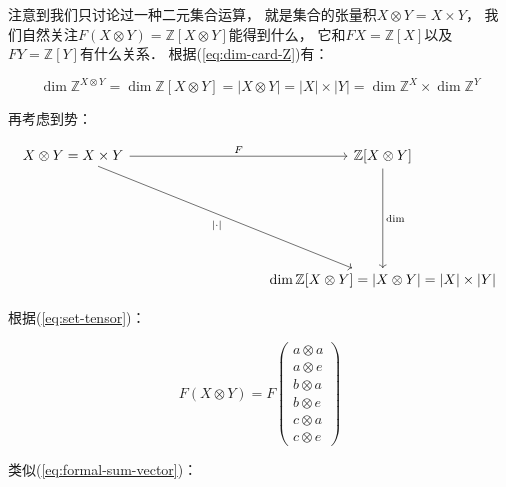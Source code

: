 \documentclass[10pt, openany]{book}
\begin{document}
注意到我们只讨论过一种二元集合运算，
就是集合的张量积$X \otimes Y = X \times Y$，
我们自然关注$F(X \otimes Y) = \mathbb Z[X \otimes Y]$能得到什么，
它和$FX = \mathbb Z[X]$以及$FY = \mathbb Z[Y]$有什么关系．
根据(\ref{eq:dim-card-Z})有：

\begin{equation}
\dim \mathbb Z^{X \otimes Y} = \dim \mathbb Z[X \otimes Y] = |X \otimes Y| = |X| \times |Y|
= \dim \mathbb Z^X \times \dim \mathbb Z^Y
\end{equation}\label{eq:dim-card}

再考虑到势：

$$
\begin{tikzcd}
X \otimes Y = X \times Y \arrow[rrrr, "F"] \arrow[rrrrdddd, "|\cdot|"'] &  &  &  & {\mathbb Z[X \otimes Y]} \arrow[dddd, "\dim"]                  \\
                                                                        &  &  &  &                                                                \\
                                                                        &  &  &  &                                                                \\
                                                                        &  &  &  &                                                                \\
                                                                        &  &  &  & {\dim \mathbb Z[X \otimes Y] = |X \otimes Y| = |X| \times |Y|}
\end{tikzcd}
$$

根据(\ref{eq:set-tensor})：

$$
F(X \otimes Y)
=F\begin{pmatrix}a \otimes a \\ a \otimes e \\ b \otimes a \\ b \otimes e \\ c \otimes a \\ c \otimes e\end{pmatrix}
$$

类似(\ref{eq:formal-sum-vector})：
\end{document}
